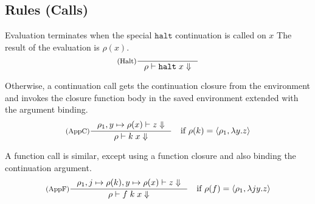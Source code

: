 \documentclass[11pt]{article}
\newcommand{\kw}[1]{\mathtt{#1}}
\begin{document}
\subsection*{Rules (Calls)}

Evaluation terminates when the special $\kw{halt}$ continuation is called on $x$
The result of the evaluation is $\rho(x)$.
\[
\inference[(Halt)]
{}
{\interp{\rho}{\appc{\kw{halt}}{x}}}
\]

Otherwise, a continuation call gets the continuation closure from the environment and invokes the closure function body in the saved environment extended with the argument binding.
\[
\begin{array}{cl}
\inference[(AppC)]
{\interp{\extv{\rho_1}{y}{\rho(x)}}{z}}
{\interp{\rho}{\appc{k}{x}}}
&
\text{if $\rho(k) = \clsc{\rho_1}{y}{z}$}
\end{array}
\]

A function call is similar, except using a function closure and also binding the continuation argument.
\[
\begin{array}{cl}
\inference[(AppF)]
{\interp{\extv{\extv{\rho_1}{j}{\rho(k)}}{y}{\rho(x)}}{z}}
{\interp{\rho}{\appf{f}{k}{x}}}
&
\text{if $\rho(f) = \clsf{\rho_1}{j}{y}{z}$}
\end{array}
\]
\end{document}
